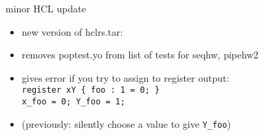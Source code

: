 \begin{frame}{minor HCL update}
    \begin{itemize}
    \item new version of hclrs.tar:
    \vspace{.5cm}
    \item removes poptest.yo from list of tests for seqhw, pipehw2
    \item gives error if you try to assign to register output: \\
        {\tt register xY \{ foo : 1 = 0; \}\\ x\_foo = 0; Y\_foo = 1; } 
    \item (previously: silently choose a value to give {\tt Y\_foo})
    \end{itemize}
\end{frame}
